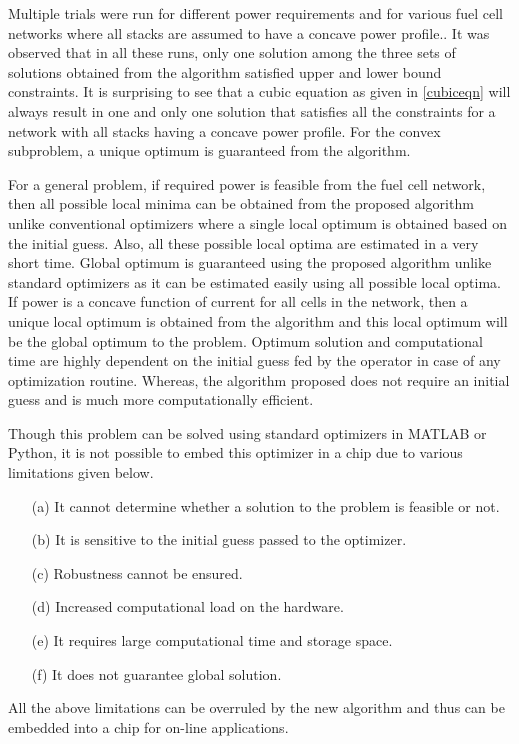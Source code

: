 \documentclass[twocolumn]{autart}
\begin{document}
Multiple trials were run for different power requirements and for various fuel cell networks where all stacks are assumed to have a concave power profile.. It was observed that in all these runs, only one solution among the three sets of solutions obtained from the algorithm satisfied upper and lower bound constraints. It is surprising to see that a cubic equation as given in \eqref{cubiceqn} will always result in one and only one solution that satisfies all the constraints for a network with all stacks having a concave power profile. For the convex subproblem, a unique optimum is guaranteed from the algorithm. 

For a general problem, if required power is feasible from the fuel cell network, then all possible local minima can be obtained from the proposed algorithm unlike conventional optimizers where a single local optimum is obtained based on the initial guess. Also, all these possible local optima are estimated in a very short time. Global optimum is guaranteed using the proposed algorithm unlike standard optimizers as it can be estimated easily using all possible local optima. If power is a concave function of current for all cells in the network, then a unique local optimum is obtained from the algorithm and this local optimum will be the global optimum to the problem. Optimum solution and computational time are highly dependent on the initial guess fed by the operator in case of any optimization routine. Whereas, the algorithm proposed does not require an initial guess and is much more computationally efficient. 

Though this problem can be solved using standard optimizers in MATLAB or Python, it is not possible to embed this optimizer in a chip due to various limitations given below. 
\begin{itemize}
	\item[(a)] It cannot determine whether a solution to the problem is feasible or not. 
	\item[(b)] It is sensitive to the initial guess passed to the optimizer.
	\item[(c)] Robustness cannot be ensured.
	\item[(d)] Increased computational load on the hardware.
	\item[(e)] It requires large computational time and storage space.
	\item[(f)] It does not guarantee global solution.
\end{itemize}
All the above limitations can be overruled by the new algorithm and thus can be embedded into a chip for on-line applications.
\end{document}
